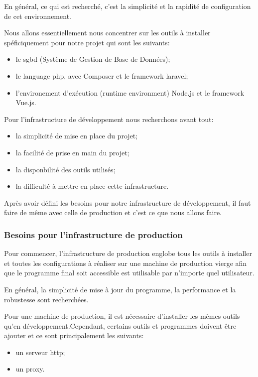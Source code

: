 \documentclass[
    iai, %
    il, %
]{heig-tb}
\begin{document}
En général, ce qui est recherché, c'est la simplicité et la rapidité de configuration de cet environnement.

Nous allons essentiellement nous concentrer sur les outils à installer spéficiquement pour notre projet qui sont les suivants:
\begin{itemize}
    \item le \Gls{sgbd} (Système de Gestion de Base de Données);
    \item le language \Gls{php}, avec Composer et le \Gls{framework} \Gls{laravel};
    \item l'environement d'exécution (runtime environment) Node.js et le \Gls{framework} Vue.js.
\end{itemize}

Pour l'infrastructure de développement nous recherchons avant tout:
\begin{itemize}
    \item la simplicité de mise en place du projet;
    \item la facilité de prise en main du projet;
    \item la disponbilité des outils utilisés;
    \item la difficulté à mettre en place cette infrastructure.
\end{itemize}

Après avoir défini les besoins pour notre infrastructure de développement, il faut faire de même avec celle de production et c'est ce que nous allons faire.

\subsubsection{Besoins pour l'infrastructure de production}
Pour commencer, l'infrastructure de production englobe tous les outils à installer et toutes les configurations à réaliser sur une machine de production vierge afin que le programme final soit accessible est utilisable par n'importe quel utilisateur.

En général, la simplicité de mise à jour du programme, la performance et la robustesse sont recherchées.

Pour une machine de production, il est nécessaire d'installer les mêmes outils qu'en développement.Cependant, certains outils et programmes doivent être ajouter et ce sont principalement les suivants:
\begin{itemize}
    \item un serveur \Gls{http};
    \item un \Gls{proxy}.
\end{itemize}
\end{document}
